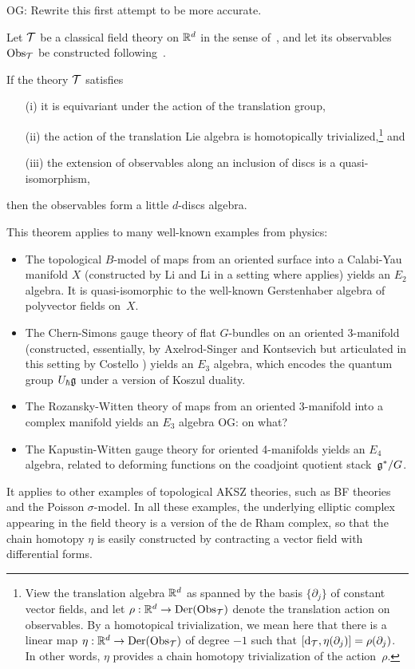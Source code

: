 \documentclass[11pt]{amsart}
\def\owen#1{{\textcolor{violet!50!black}{OG: {#1}}}}
\begin{document}
\owen{Rewrite this first attempt to be more accurate.}

\begin{thm}
\label{thm: EllSaf}
Let $\mathcal T$ be a classical field theory on $\mathbb R^d$ in the sense of~\cite{CosBook},
and let its observables ${\rm Obs}_\mathcal T$ be constructed following~\cite{CG2}.

If the theory $\mathcal T$ satisfies 
\begin{enumerate}
\item[(i)] it is equivariant under the action of the translation group,
\item[(ii)] the action of the translation Lie algebra is homotopically trivialized,\footnote{View the translation algebra $\mathbb R^d$ as spanned by the basis $\{\partial_j\}$ of constant vector fields, and let $\rho: \mathbb R^d \to {\rm Der}({\rm Obs}_\mathcal T)$ denote the translation action on observables.
By a homotopical trivialization, we mean here that there is a linear map $\eta: \mathbb R^d \to {\rm Der}({\rm Obs}_\mathcal T)$ of degree $-1$ such that $[{\rm d}_{\mathcal T}, \eta(\partial_j)] = \rho(\partial_j)$.
In other words, $\eta$ provides a chain homotopy trivialization of the action~$\rho$.} 
and
\item[(iii)] the extension of observables along an inclusion of discs is a quasi-isomorphism,
\end{enumerate}
then the observables form a little $d$-discs algebra.
\end{thm}

This theorem applies to many well-known examples from physics:
\begin{itemize}
\item The topological $B$-model of maps from an oriented surface into a Calabi-Yau manifold $X$ (constructed by Li and Li \cite{LiLi} in a setting where \cite{EllSaf} applies) yields an $E_2$ algebra. It is quasi-isomorphic to the well-known Gerstenhaber algebra of polyvector fields on~$X$.
\item The Chern-Simons gauge theory of flat $G$-bundles on an oriented 3-manifold (constructed, essentially, by Axelrod-Singer \cite{AxeSin} and Kontsevich \cite{KonECM} but articulated in this setting by Costello \cite{CosBook}) yields an $E_3$ algebra, which encodes the quantum group $U_\hbar \mathfrak g$ under a version of Koszul duality.
\item The Rozansky-Witten theory of maps from an oriented 3-manifold into a complex manifold \cite{ChanLeungLi} yields an $E_3$ algebra \owen{on what?}
\item The Kapustin-Witten gauge theory for oriented 4-manifolds \cite{EGW} yields an $E_4$ algebra, related to deforming functions on the coadjoint quotient stack~$\mathfrak g^*/G$.
\end{itemize}
It applies to other examples of topological AKSZ theories, such as BF theories and the Poisson $\sigma$-model.
In all these examples, the underlying elliptic complex appearing in the field theory is a version of the de Rham complex,
so that the chain homotopy $\eta$ is easily constructed by contracting a vector field with differential forms.
\end{document}
